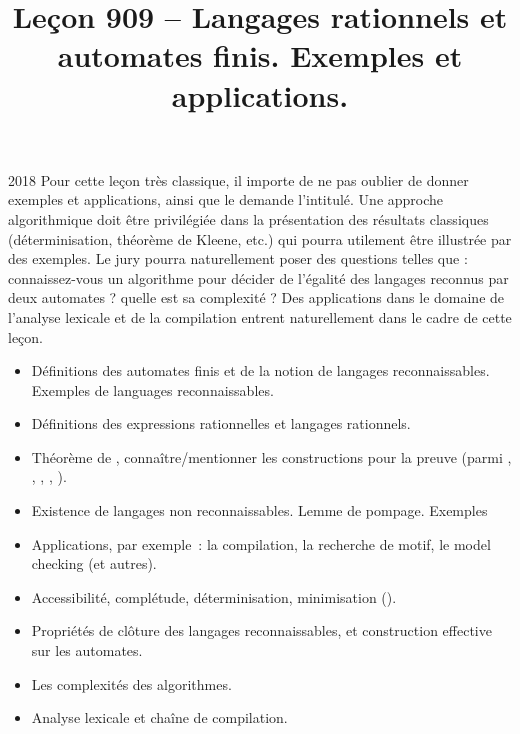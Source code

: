 \documentclass{agregfiche}
\title{Leçon 909 -- Langages rationnels et automates finis.  Exemples et applications.}
\begin{document}
\maketitle

\secrapports

\begin{rapport}{2018}
Pour cette leçon très classique, il importe de ne pas oublier de donner exemples et applications, ainsi
que le demande l’intitulé.
Une approche algorithmique doit être privilégiée dans la présentation des résultats classiques (déterminisation, théorème de
Kleene, etc.) qui pourra utilement être illustrée par des exemples. Le jury pourra naturellement poser des questions telles que : connaissez-vous un algorithme pour décider de l’égalité des langages reconnus par deux automates ? quelle est sa complexité ?
Des applications dans le domaine de l’analyse lexicale et de la compilation entrent naturellement dans
le cadre de cette leçon.
\end{rapport}

\secindispensables

\begin{itemize}
\item  Définitions des automates finis et de la notion de langages reconnaissables. Exemples de languages reconnaissables.
\item Définitions des expressions rationnelles et langages rationnels.
\item Théorème de , connaître/mentionner les constructions pour la preuve (parmi , , , , ).
\end{itemize}

\secasavoir

\begin{itemize}
	\item Existence de langages non reconnaissables. Lemme de pompage. Exemples
	\item Applications, par exemple~: la compilation, la recherche de motif, le
	model checking (et autres).
	\item Accessibilité, complétude, déterminisation, minimisation ().
	\item Propriétés de clôture des langages reconnaissables, et construction
	effective sur les automates.
	\item Les complexités des algorithmes.
  	\item Analyse lexicale et chaîne de compilation.
\end{itemize}
\end{document}
